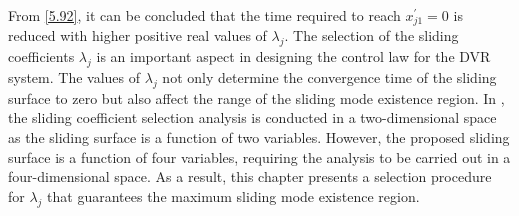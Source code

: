 From \eqref{5.92}, it can be concluded that the time required to reach $x^{\prime}_{j1} = 0$ is reduced with higher positive real values of $\lambda_j$. The selection of the sliding coefficients $\lambda_j$ is an important aspect in designing the control law for the DVR system. The values of $\lambda_j$ not only determine the convergence time of the sliding surface to zero but also affect the range of the sliding mode existence region. In \cite{7506128}, the sliding coefficient selection analysis is conducted in a two-dimensional space as the sliding surface is a function of two variables. However, the proposed sliding surface is a function of four variables, requiring the analysis to be carried out in a four-dimensional space. As a result, this chapter presents a selection procedure for $\lambda_j$ that guarantees the maximum sliding mode existence region. 

\vspace*{-0.5cm}
